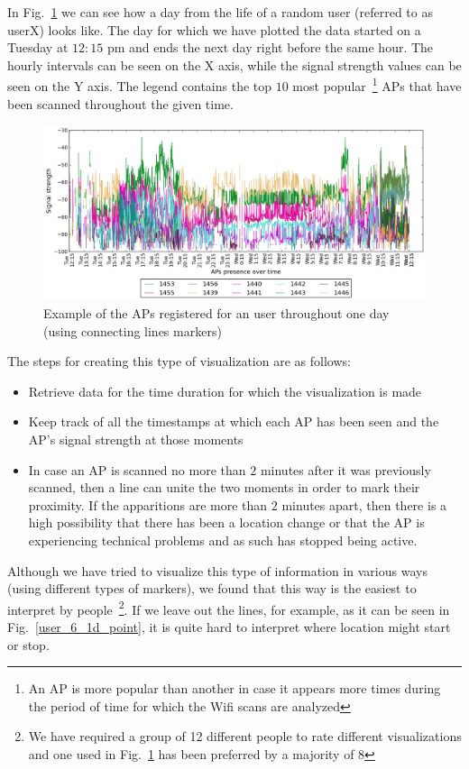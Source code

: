 In Fig.~\ref{user_6_1d_lines} we can see how a day from the life of a random
user (referred to as userX) looks like. The day for which we have plotted the
data started on a Tuesday at $12:15$ pm and ends the next day right before the
same hour. The hourly intervals can be seen on the X axis, while the signal
strength values can be seen on the Y axis. The legend contains the top $10$ most
popular~\footnote{An AP is more popular than another in case it appears more
times during the period of time for which the Wifi scans are analyzed} APs that
have been scanned throughout the given time.

\begin{figure}[h]
\centering
\includegraphics[width
=\textwidth, height =
0.4\textwidth]{figures/user_6_sorted_1days_plot.png}
\caption{Example of the APs registered for an user throughout one day (using
connecting lines markers)}
\label{user_6_1d_lines}
\end{figure}

The steps for creating this type of visualization are as follows:
\begin{itemize}
  \item Retrieve data for the time duration for which the visualization is made
  \item Keep track of all the timestamps at which each AP has been seen and the
  AP's signal strength at those moments
  \item In case an AP is scanned no more than $2$ minutes after it was
  previously scanned, then a line can unite the two moments in order to mark
  their proximity. If the apparitions are more than $2$ minutes apart, then
  there is a high possibility that there has been a location change or that the
  AP is experiencing technical problems and as such has stopped being active.
\end{itemize}

Although we have tried to visualize this type of information in various ways
(using different types of markers), we found that this way is the easiest to
interpret by people~\footnote{We have required a group of 12 different people to
rate different visualizations and one used in Fig.~\ref{user_6_1d_lines} has
been preferred by a majority of 8}. If we leave out the lines, for example, as
it can be seen in Fig.~\ref{user_6_1d_point}, it is quite hard to interpret
where location might start or stop.

